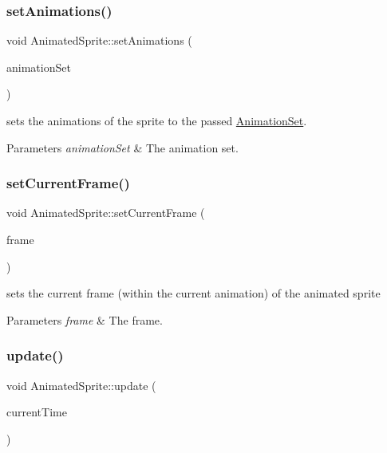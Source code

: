 \subsubsection{\texorpdfstring{set\+Animations()}{setAnimations()}}
{\footnotesize\ttfamily void Animated\+Sprite\+::set\+Animations (\begin{DoxyParamCaption}\item[{\hyperlink{class_animation_set}{Animation\+Set} $\ast$}]{animation\+Set }\end{DoxyParamCaption})}



sets the animations of the sprite to the passed \hyperlink{class_animation_set}{Animation\+Set}. 


\begin{DoxyParams}{Parameters}
{\em animation\+Set} & The animation set.\\
\hline
\end{DoxyParams}
\mbox{\label{class_animated_sprite_a8ad3a9bac853b0b55fb3efd96c93a2d5}} 
\subsubsection{\texorpdfstring{set\+Current\+Frame()}{setCurrentFrame()}}
{\footnotesize\ttfamily void Animated\+Sprite\+::set\+Current\+Frame (\begin{DoxyParamCaption}\item[{unsigned int}]{frame }\end{DoxyParamCaption})}



sets the current frame (within the current animation) of the animated sprite 


\begin{DoxyParams}{Parameters}
{\em frame} & The frame.\\
\hline
\end{DoxyParams}
\mbox{\label{class_animated_sprite_afdeda3e3030963a8ba290e23e48acc40}} 
\subsubsection{\texorpdfstring{update()}{update()}}
{\footnotesize\ttfamily void Animated\+Sprite\+::update (\begin{DoxyParamCaption}\item[{sf\+::\+Time}]{current\+Time }\end{DoxyParamCaption})\hspace{0.3cm}{\ttfamily [virtual]}}



